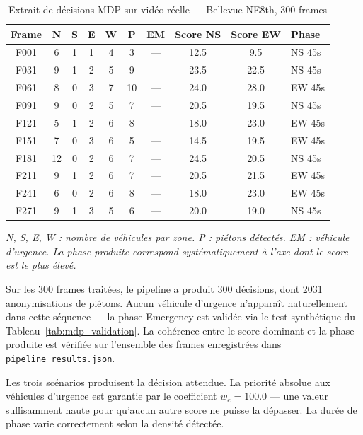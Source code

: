 \begin{table}[H]
\centering
\caption{Extrait de décisions MDP sur
         vidéo réelle — Bellevue NE8th,
         300 frames}
\scriptsize
\renewcommand{\arraystretch}{1.05}
\begin{tabularx}{\textwidth}{cccccccccX}
\toprule
\textbf{Frame} &
\textbf{N} &
\textbf{S} &
\textbf{E} &
\textbf{W} &
\textbf{P} &
\textbf{EM} &
\textbf{Score NS} &
\textbf{Score EW} &
\textbf{Phase} \\
\midrule
F001  & 6  & 1 & 1 & 4 & 3 & — & 12.5 & 9.5  & NS 45s \\
F031  & 9  & 1 & 2 & 5 & 9 & — & 23.5 & 22.5 & NS 45s \\
F061  & 8  & 0 & 3 & 7 & 10 & — & 24.0 & 28.0 & EW 45s \\
F091  & 9  & 0 & 2 & 5 & 7 & — & 20.5 & 19.5 & NS 45s \\
F121  & 5  & 1 & 2 & 6 & 8 & — & 18.0 & 23.0 & EW 45s \\
F151  & 7  & 0 & 3 & 6 & 5 & — & 14.5 & 19.5 & EW 45s \\
F181  & 12 & 0 & 2 & 6 & 7 & — & 24.5 & 20.5 & NS 45s \\
F211  & 9  & 1 & 2 & 6 & 7 & — & 20.5 & 21.5 & EW 45s \\
F241  & 6  & 0 & 2 & 6 & 8 & — & 18.0 & 23.0 & EW 45s \\
F271  & 9  & 1 & 3 & 5 & 6 & — & 20.0 & 19.0 & NS 45s \\
\bottomrule
\end{tabularx}
\vspace{0.3em}
\begin{flushleft}
\scriptsize\textit{N, S, E, W : nombre de
véhicules par zone. P : piétons détectés.
EM : véhicule d'urgence. La phase produite
correspond systématiquement à l'axe dont
le score est le plus élevé.}
\end{flushleft}
\renewcommand{\arraystretch}{1}
\label{tab:mdp_real_decisions}
\end{table}

Sur les 300 frames traitées, le pipeline
a produit 300 décisions, dont 2031
anonymisations de piétons. Aucun véhicule
d'urgence n'apparaît naturellement dans
cette séquence — la phase Emergency est
validée via le test synthétique du
Tableau~\ref{tab:mdp_validation}.
La cohérence entre le score dominant et
la phase produite est vérifiée sur
l'ensemble des frames enregistrées dans
\texttt{pipeline\_results.json}.

Les trois scénarios produisent la décision
attendue. La priorité absolue aux véhicules
d'urgence est garantie par le coefficient
$w_e = 100.0$ — une valeur suffisamment
haute pour qu'aucun autre score ne puisse
la dépasser. La durée de phase varie
correctement selon la densité détectée.

